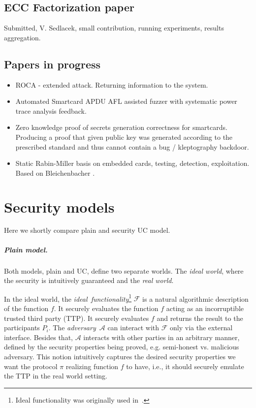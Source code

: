 \documentclass[
  digital, %
  twoside, %
  table,   %
  lof,     %
  lot,     %
]{fithesis3}
\theoremstyle{definition}
\theoremstyle{remark}
\begin{document}
\begin{ecmmnt}
\section{ECC Factorization paper}
Submitted, V. Sedlacek, small contribution, running experiments, results aggregation. 

\section{Papers in progress}
\begin{itemize}
	\item ROCA - extended attack. Returning information to the system.
    
	\item Automated Smartcard APDU AFL assisted fuzzer with systematic power trace analysis feedback.
    
    \item Zero knowledge proof of secrets generation correctness for smartcards. Producing a proof that given public key was generated according to the prescribed standard and thus cannot contain a bug / kleptography backdoor. 
    
    \item Static Rabin-Miller basis on embedded cards, testing, detection, exploitation. Based on Bleichenbacher \cite{10.1007/978-3-540-30580-4_2}.
    
\end{itemize}
\end{ecmmnt}

\chapter{Security models}
\label{apx:uc}
Here we shortly compare plain and security UC model.

\paragraph{Plain model.}
Both models, plain and UC, define two separate worlds.
The \emph{ideal world}, where the security is intuitively guaranteed and the \emph{real world}.

In the ideal world, the \emph{ideal~functionality}\footnote{Ideal functionality was originally used in~\cite{GMW87}.} $\mathcal{F}$ is a natural algorithmic description of the function $f$. It securely evaluates the function $f$ acting as an incorruptible trusted third party (TTP). It securely evaluates $f$ and returns the result to the participants $P_i$. The \emph{adversary}~$\mathcal{A}$ can interact with $\mathcal{F}$ only via the external interface. Besides that, $\mathcal{A}$ interacts with other parties in an arbitrary manner, defined by the security properties being proved, e.g. semi-honest vs. malicious adversary.
This notion intuitively captures the desired security properties we want the protocol $\pi$ realizing function $f$ to have, i.e., it should securely emulate the TTP in the real world setting.
\end{document}
